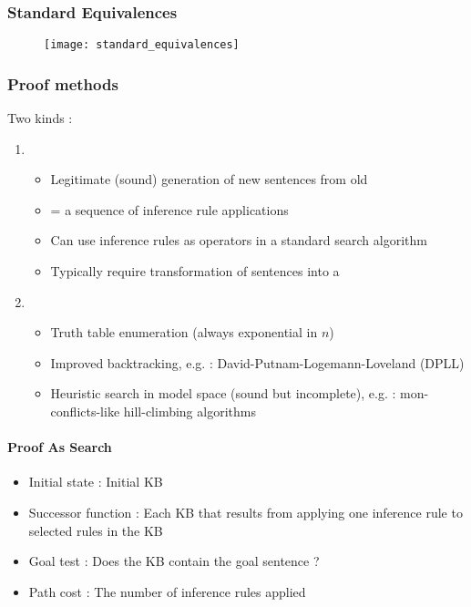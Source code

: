 \subsubsection{Standard Equivalences}

\begin{figure}[H]
    \centering
    \texttt{[image: standard\_equivalences]}
\end{figure}

\subsubsection{Proof methods}

Two kinds :
\begin{enumerate}
\item {}
	\begin{itemize}
	\item Legitimate (sound) generation of new sentences from old
	\item {} = a sequence of inference rule applications
	\item Can use inference rules as operators in a standard search algorithm
	\item Typically require transformation of sentences into a 
	\end{itemize}
\item {}
	\begin{itemize}
	\item Truth table enumeration (always exponential in $n$)
	\item Improved backtracking, e.g. : David-Putnam-Logemann-Loveland (DPLL)
	\item Heuristic search in model space (sound but incomplete), e.g. : mon-conflicts-like hill-climbing algorithms
	\end{itemize}
\end{enumerate}

\paragraph{Proof As Search}

\begin{itemize}
\item Initial state : Initial KB
\item Successor function : Each KB that results from applying one inference rule to selected rules in the KB
\item Goal test : Does the KB contain the goal sentence ?
\item Path cost : The number of inference rules applied
\end{itemize}

